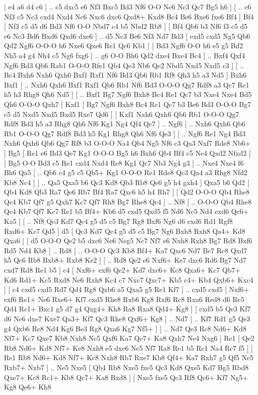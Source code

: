 \makegametitle 
|   e4   a6    d4   c6 [ .. c5  dxc5 e6  Nf3 Bxc5  Bd3 Nf6  O-O Nc6  Nc3 Qc7  Bg5 h6   ]  [ .. c6  Nf3 c5  Nc3 cxd4  Nxd4 Nc6  Nxc6 dxc6  Qxd8+ Kxd8  Bc4 Be6  Bxe6 fxe6  Bf4   ]  Bf4 [  Nf3 c5  d5 d6  Bd3 Nf6  O-O Nbd7  c4 b5  Nbd2 Rb8   ]  [  Bf4 Qb6  b3 Nf6  f3 c5  d5 e6  Nc3 Bd6  Bxd6 Qxd6  dxe6   ] .. d5    Nc3   Be6    Nf3   Nd7    Bd3 [  exd5 cxd5  Ng5 Qb6  Qd2 Ngf6  O-O-O h6  Nxe6 Qxe6  Re1 Qc6  Kb1   ]  [  Bd3 Ngf6  O-O h6  e5 g5  Bd2 Nh5  a4 g4  Nh4 c5  Ng6 fxg6   ] .. g6    O-O   Bh6    Qd2   dxe4    Bxe4   Bc4 [ .. Bxf4  Qxf4 Ngf6  Bd3 Qb6  Rab1 O-O-O  Rfe1 Qb4  Qe3 Nb6  Qe2 Nbd5  Nxd5 Nxd5  c3   ]  [ .. Bc4  Bxh6 Nxh6  Qxh6 Bxf1  Rxf1 Nf6  Bd3 Qb6  Rb1 Rf8  Qh3 h5  a3 Nd5   ]  Bxh6   Bxf1 [ .. Nxh6  Qxh6 Bxf1  Rxf1 Qb6  Rb1 Nf6  Bd3 O-O-O  Qg7 Rdf8  a3 Qc7  Re1 h5  h3 Rhg8  Qh6 Nd5   ]  [ .. Bxf1  Bg7 Ngf6  Bxh8 Bc4  Re1 Qc7  b3 Nxe4  Nxe4 Bd5  Qh6 O-O-O  Qxh7   ]  Kxf1 [  Bg7 Ngf6  Bxh8 Bc4  Re1 Qc7  b3 Be6  Bd3 O-O-O  Bg7 c5  d5 Nxd5  Nxd5 Bxd5  Rxe7 Qd6   ]  [  Kxf1 Nxh6  Qxh6 Qb6  Rb1 O-O-O  Qg7 Rdf8  Bd3 h5  a3 Rhg8  Qh6 Nf6  Kg1 Ng4  Qf4 Qc7   ] .. Ngf6 [ .. Nxh6  Qxh6 Qb6  Rb1 O-O-O  Qg7 Rdf8  Bd3 h5  Kg1 Rhg8  Qh6 Nf6  Qe3   ]  [ .. Ngf6  Re1 Ng4  Bd3 Nxh6  Qxh6 Qb6  Qg7 Rf8  b3 O-O-O  Na4 Qb4  Ng5 Nf6  c3 Qa3  Nxf7 Rde8  Nb6+   ]  Bg5 [  Re1 e6  Bd3 Qe7  Kg1 O-O-O  Bg5 h6  Bxh6 Qb4  Bf4 c5  Ne4 Qxd2  Nfxd2   ]  [  Bg5 O-O  Bd3 c5  Re1 cxd4  Nxd4 Re8  Kg1 Qc7  Nb3 Ng4  g3   ] .. Nxe4    Nxe4   f6    Bh6   Qa5 [ .. Qb6  c4 g5  c5 Qb5+  Kg1 O-O-O  Re1 Rde8  Qc3 Qa4  a3 Rhg8  Nfd2 Kb8  Nc4   ]  [ .. Qa5  Qxa5 b6  Qc3 Kd8  Qb3 Rb8  Qe6 g5  h4 gxh4   ]  Qxa5   b6    Qd2 [  Qb4 Kd8  Qb3 Ra7  Qe6 Rb7  Bf4 Ra7  Qxc6 h5  h4 Rh7   ]  [  Qd2 O-O-O  Qb4 Rhe8  Qc4 Kb7  Qf7 g5  Qxh7 Kc7  Qf7 Rh8  Bg7 Rhe8  Qc4   ] .. Nf8 [ .. O-O-O  Qb4 Rhe8  Qc4 Kb7  Qf7 Kc7  Re1 b5  Bf4+ Kb6  d5 cxd5  Qxd5 f5  Nd6 Nc5  Nd4 exd6  Qc6+ Ka5   ]  [ .. Nf8  Qc3 Kd7  Qc4 g5  d5 c5  Bg7 Rg8  Bxf6 Ng6  d6 exd6  Rd1 Rgf8  Rxd6+ Kc7  Qd5   ]  d5 [  Qc3 Kd7  Qc4 g5  d5 c5  Bg7 Ng6  Bxh8 Rxh8  Qa4+ Kd8  Qxa6   ]  [  d5 O-O-O  Qe2 b5  dxc6 Ne6  Neg5 Nc7  Nf7 e6  Nxh8 Rxh8  Bg7 Rd8  Bxf6 Rd5  Nd4 Kb8   ] .. Rd8 [ .. O-O-O  Qc3 Kb8  Bf4+ Ka7  Qxc6 Nd7  Bc7 Rc8  Qxd7 h5  Qc6 Rb8  Bxb8+ Rxb8  Ke2   ]  [ .. Rd8  Qe2 e6  Nxf6+ Ke7  dxc6 Rd6  Bg7 Nd7  cxd7 Rd8  Re1 b5   ]  c4 [  Nxf6+ exf6  Qe2+ Kd7  dxc6+ Kc8  Qxa6+ Kc7  Qb7+ Kd6  Rd1+ Kc5  Rxd8 Ne6  Rxh8 Kc4  c7 Nxc7  Qxc7+ Kb5  c4+ Kb4  Qxb6+ Kxc4   ]  [  c4 cxd5  cxd5 Rd7  Qd4 Rg8  Qxb6 a5  Qxa5 g5  Re1 Kf7   ] .. cxd5    cxd5 [  Nxf6+ exf6  Re1+ Ne6  Rxe6+ Kf7  cxd5 Rhe8  Rxb6 Kg8  Rxf6 Rc8  Rxa6 Red8  d6 Rc5  Qd4 Rc1+  Bxc1 g5  d7 g4  Qxg4+ Kh8  Ra8 Rxa8  Qd4+ Kg8   ]  [  cxd5 b5  Qe3 Kf7  d6 Ne6  dxe7 Kxe7  Qa3+ Kf7  Qc3 Rhe8  Qxf6+ Kg8   ] .. Nd7 [ .. Kf7  Rd1 g5  Qe3 g4  Qxb6 Re8  Nd4 Kg6  Be3 Rg8  Qxa6 Kg7  Nf5+   ]  [ .. Nd7  Qe3 Rc8  Nd6+ Kd8  Nf7+ Kc7  Qxe7 Kb8  Nxh8 Nc5  Qxf6 Ka7  Qe7+ Ka8  Qxh7 Ne4  Nxg6   ]  Re1 [  Qe2 Rb8  Nd6+ Kd8  Nf7+ Ke8  Nxh8 e5  dxe6 Nc5  Nf7 Ra8  Re1 b5  Rc1 Na4  Rc7 f5   ]  [  Re1 Rb8  Nd6+ Kd8  Nf7+ Kc8  Nxh8 Rb7  Rxe7 Kb8  Qf4+ Ka7  Rxh7 g5  Qf5 Nc5  Rxb7+ Nxb7   ] .. Ne5    Nxe5 [  Qb4 Rb8  Nxe5 fxe5  Qc3 Kd8  Qxe5 Kd7  Bg5 Rbd8  Qxe7+ Kc8  Rc1+ Kb8  Qc7+ Ka8  Bxd8   ]  [  Nxe5 fxe5  Qc3 Rf8  Qc6+ Kf7  Ng5+ Kg8  Qe6+ Kh8  